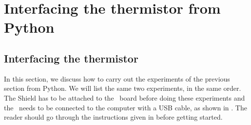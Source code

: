 \section{Interfacing the thermistor from Python}
\subsection{Interfacing the thermistor}
In this section, we discuss how to carry out the experiments of the
previous section from Python.  We will list the same two experiments,
in the same order.  The Shield has to be attached to the \arduino\ board
before doing these experiments and the \arduino\ needs to be connected to the computer
with a USB cable, as shown in .
The reader should go through the instructions given in
 before getting started.

